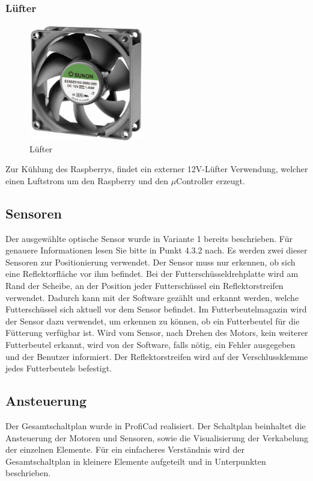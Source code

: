 \subsubsection{Lüfter}
\begin{figure}[H] 
\begin{center}

\includegraphics[width=5cm]{Bilder/Bauteile/Luefter}
\caption{Lüfter}
\label{Luefter}

\end{center}
\end{figure}
Zur Kühlung des Raspberrys, findet ein externer 12V-Lüfter Verwendung, welcher einen Luftstrom um den Raspberry und den $\mu$Controller erzeugt.
\subsection{Sensoren}
Der ausgewählte optische Sensor wurde in Variante 1 bereits beschrieben. Für genauere Informationen lesen Sie bitte in Punkt 4.3.2 nach.
Es werden zwei dieser Sensoren zur Positionierung verwendet. Der Sensor muss nur erkennen, ob sich eine Reflektorfläche vor ihm befindet. Bei der Futterschüsseldrehplatte wird am Rand der Scheibe, an der Position jeder Futterschüssel ein Reflektorstreifen verwendet. Dadurch kann mit der Software gezählt und erkannt werden, welche Futterschüssel sich aktuell vor dem Sensor befindet. Im Futterbeutelmagazin wird der Sensor dazu verwendet, um erkennen zu können, ob ein Futterbeutel für die Fütterung verfügbar ist. Wird vom Sensor, nach Drehen des Motors, kein weiterer Futterbeutel erkannt, wird von der Software, falls nötig, ein Fehler ausgegeben und der Benutzer informiert. Der Reflektorstreifen wird auf der Verschlussklemme jedes Futterbeutels befestigt.
\subsection{Ansteuerung}
Der Gesamtschaltplan wurde in ProfiCad realisiert. Der Schaltplan beinhaltet die Ansteuerung der Motoren und Sensoren, sowie die Visualisierung der Verkabelung der einzelnen Elemente.
Für ein einfacheres Verständnis wird der Gesamtschaltplan in kleinere Elemente aufgeteilt und in Unterpunkten beschrieben.
\newpage
